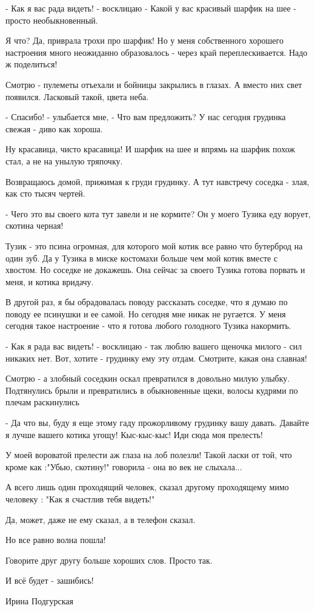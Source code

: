 - Как я вас рада видеть! - восклицаю - Какой у вас красивый шарфик на шее -
просто необыкновенный.

Я что? Да, приврала трохи про шарфик! Но у меня собственного хорошего
настроения много неожиданно образовалось - через край переплескивается. Надо ж
поделиться!

Смотрю - пулеметы отъехали и бойницы закрылись в глазах. А вместо них свет
появился. Ласковый такой, цвета неба.

- Спасибо! - улыбается мне, - Что вам предложить? У нас сегодня грудинка свежая
- диво как хороша. 

Ну красавица, чисто красавица! И шарфик на шее и впрямь на шарфик похож стал, а
не на унылую тряпочку.

Возвращаюсь домой, прижимая к груди грудинку. А тут навстречу соседка - злая,
как сто тысяч чертей.

- Чего это вы своего кота тут завели и не кормите? Он у моего Тузика еду
ворует, скотина черная!

Тузик - это псина огромная, для которого мой котик все равно что бутерброд на
один зуб. Да у Тузика в миске костомахи больше чем мой котик вместе с хвостом.
Но соседке не докажешь. Она сейчас за своего Тузика готова порвать и меня, и
котика вридачу.

В другой раз, я бы обрадовалась поводу рассказать соседке, что я думаю по
поводу ее псинушки и ее самой. Но сегодня мне никак не ругается. У меня сегодня
такое настроение - что я готова любого голодного Тузика накормить.

- Как я рада вас видеть! - восклицаю - так люблю вашего щеночка милого - сил
никаких нет. Вот, хотите - грудинку ему эту отдам. Смотрите, какая она славная! 

Смотрю - а злобный соседкин оскал превратился в довольно милую улыбку.
Подтянулись брыли и превратились в обыкновенные щеки, волосы кудрями по плечам
раскинулись

- Да что вы, буду я еще этому гаду прожорливому грудинку вашу давать. Давайте я
лучше вашего котика угощу! Кыс-кыс-кыс! Иди сюда моя прелесть!

У моей вороватой прелести аж глаза на лоб полезли! Такой ласки от той, что
кроме как :"Убью, скотину!" говорила - она во век не слыхала...

А всего лишь один проходящий человек, сказал другому проходящему мимо человеку
: "Как я счастлив тебя видеть!"

Да, может, даже не ему сказал, а в телефон сказал.

Но все равно волна пошла!

Говорите друг другу больше хороших слов. Просто так.

И всё будет - зашибись!

Ирина Подгурская
